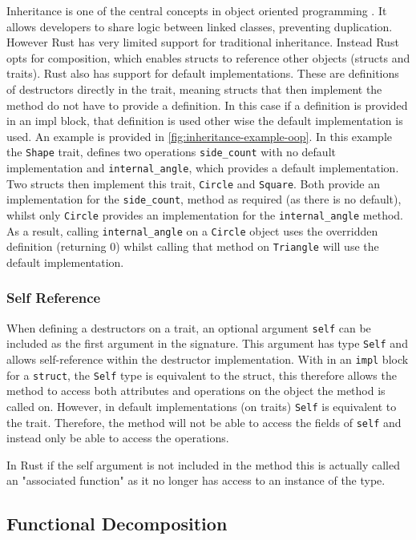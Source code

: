 \documentclass[ oneside,%
                    author={James Elgar},
                    degree={MEng},
                     title={Bidirectional transformer between functional and \\ object-oriented programming in Rust},
                  subtitle={}]{dissertation}
\newcommand{\rust}[1]{\texttt{#1}}
\begin{document}
Inheritance is one of the central concepts in object oriented programming \cite{cook_palsberg_1989}. It allows developers to share logic between linked classes, preventing duplication. 
However Rust has very limited support for traditional inheritance. Instead Rust opts for composition, which enables structs to reference other objects (structs and traits).
Rust also has support for default implementations. These are definitions of destructors directly in the trait, meaning structs that then implement the method do not have to provide a definition. In this case if a definition is provided in an impl block, that definition is used other wise the default implementation is used.
An example is provided in \autoref{fig:inheritance-example-oop}. In this example the \rust{Shape} trait, defines two operations \rust{side_count} with no default implementation and \rust{internal_angle}, which provides a default implementation.
Two structs then implement this trait, \rust{Circle} and \rust{Square}. Both provide an implementation for the \rust{side_count}, method as required (as there is no default), whilst only \rust{Circle} provides an implementation for the \rust{internal_angle} method.
As a result, calling \rust{internal_angle} on a \rust{Circle} object uses the overridden definition (returning 0) whilst calling that method on \rust{Triangle} will use the default implementation.

\subsubsection{Self Reference}

When defining a destructors on a trait, an optional argument \rust{self} can be included as the first argument in the signature. 
This argument has type \rust{Self} and allows self-reference within the destructor implementation.
With in an \rust{impl} block for a \rust{struct}, the \rust{Self} type is equivalent to the struct, this therefore allows the method to access both attributes and operations on the object the method is called on.
However, in default implementations (on traits) \rust{Self} is equivalent to the trait. Therefore, the method will not be able to access the fields of \rust{self} and instead only be able to access the operations.  

In Rust if the self argument is not included in the method this is actually called an "associated function" as it no longer has access to an instance of the type.


\subsection{Functional Decomposition}
\end{document}
